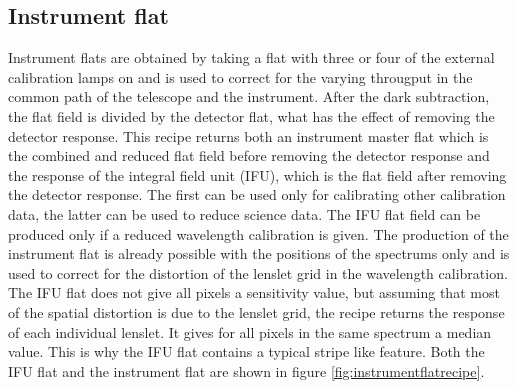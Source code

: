 \documentclass[twoside,single]{lion-msc}
\begin{document}
\subsection{Instrument flat}
Instrument flats are obtained by taking a flat with three or four of the external calibration lamps on and is used to correct for the varying througput in the common path of the telescope and the instrument. After the dark subtraction, the flat field is divided by the detector flat, what has the effect of removing the detector response. This recipe returns both an instrument master flat which is the combined and reduced flat field before removing the detector response and the response of the integral field unit (IFU), which is the flat field after removing the detector response. The first can be used only for calibrating other calibration data, the latter can be used to reduce science data. The IFU flat field can be produced only if a reduced wavelength calibration is given. The production of the instrument flat is already possible with the positions of the spectrums only and is used to correct for the distortion of the lenslet grid in the wavelength calibration. The IFU flat does not give all pixels a sensitivity value, but assuming that most of the spatial distortion is due to the lenslet grid, the recipe returns the response of each individual lenslet. It gives for all pixels in the same spectrum a median value. This is why the IFU flat contains a typical stripe like feature. Both the IFU flat and the instrument flat are shown in figure \ref{fig:instrumentflatrecipe}. 
\end{document}
